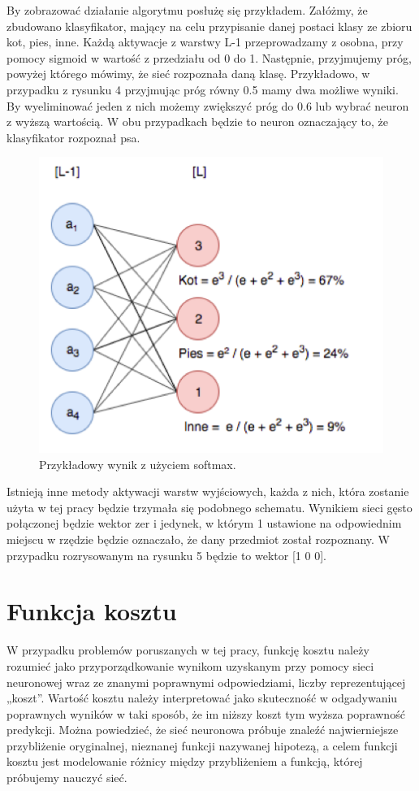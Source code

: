 By zobrazować działanie algorytmu posłużę się przykładem. Załóżmy, że zbudowano klasyfikator, mający na celu przypisanie danej postaci klasy ze zbioru {kot, pies, inne}. Każdą aktywacje z warstwy L-1 przeprowadzamy z osobna, przy pomocy sigmoid w wartość z przedziału od 0 do 1. Następnie, przyjmujemy próg, powyżej którego mówimy, że sieć rozpoznała daną klasę. Przykładowo, w przypadku z rysunku 4 przyjmując próg równy 0.5 mamy dwa możliwe wyniki. By wyeliminować jeden z nich możemy zwiększyć próg do 0.6 lub wybrać neuron z wyższą wartością. W obu przypadkach będzie to neuron oznaczający to, że klasyfikator rozpoznał psa.

\begin{figure}[ht]
\centerline{\includegraphics[scale=1]{resources/softmax.png}}
\caption{Przykładowy wynik z użyciem softmax.}
\label{fig:softmax}
\end{figure}

Istnieją inne metody aktywacji warstw wyjściowych, każda z nich, która zostanie użyta w tej pracy będzie trzymała się podobnego schematu. Wynikiem sieci gęsto połączonej będzie wektor zer i jedynek, w którym 1 ustawione na odpowiednim miejscu w rzędzie będzie oznaczało, że dany przedmiot został rozpoznany. W przypadku rozrysowanym na rysunku 5 będzie to wektor [1 0 0].

\section{Funkcja kosztu}

W przypadku problemów poruszanych w tej pracy, funkcję kosztu należy rozumieć jako przyporządkowanie wynikom uzyskanym przy pomocy sieci neuronowej wraz ze znanymi poprawnymi odpowiedziami, liczby reprezentującej „koszt”. Wartość kosztu należy interpretować jako skuteczność w odgadywaniu poprawnych wyników w taki sposób, że im niższy koszt tym wyższa poprawność predykcji. Można powiedzieć, że sieć neuronowa próbuje znaleźć najwierniejsze przybliżenie oryginalnej, nieznanej funkcji nazywanej hipotezą, a celem funkcji kosztu jest modelowanie różnicy między przybliżeniem a funkcją, której próbujemy nauczyć sieć.

